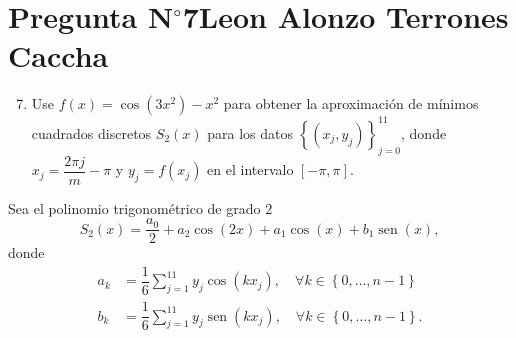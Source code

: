 \section{Pregunta N$^{\circ}$7\qquad Leon Alonzo Terrones Caccha}

\begin{frame}
    \begin{enumerate}\setcounter{enumi}{6}
        \item

              Use
              \begin{math}
                  f\left(x\right)=
                  \cos\left(3x^{2}\right)-
                  x^{2}
              \end{math}
              para obtener la aproximación de mínimos cuadrados
              discretos $S_{2}\left(x\right)$ para los datos
              \begin{math}
                  \left\{
                  \left(x_{j},y_{j}\right)
                  \right\}_{j=0}^{11}
              \end{math},
              donde $x_{j}=\dfrac{2\pi j}{m}-\pi$ y
              $y_{j}=f\left(x_{j}\right)$ en el intervalo
              $\left[-\pi,\pi\right]$.
    \end{enumerate}

    \begin{solution}
        Sea el polinomio trigonométrico de grado $2$
        \begin{equation*}
            S_{2}\left(x\right)=
            \dfrac{a_{0}}{2}+
            a_{2}\cos(2x)+
            a_{1}\cos\left(x\right)+
            b_{1}\operatorname{sen}\left(x\right),
        \end{equation*}
        donde
        \begin{align*}
            a_{k} & =
            \dfrac{1}{6}
            \sum_{j=1}^{11}
            y_{j}\cos\left(kx_{j}\right),\quad
            \forall k\in\left\{0,\dotsc,n-1\right\} \\
            b_{k} & =
            \dfrac{1}{6}
            \sum_{j=1}^{11}
            y_{j}
            \operatorname{sen}\left(kx_{j}\right),\quad
            \forall k\in\left\{0,\dotsc,n-1\right\}.
        \end{align*}
    \end{solution}
\end{frame}

